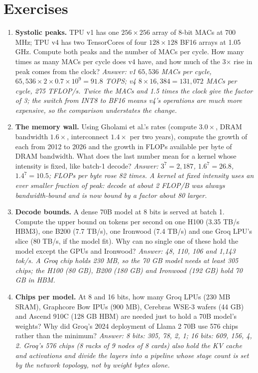\documentclass[11pt,letterpaper]{article}
\begin{document}
\section{Exercises}

\begin{enumerate}[leftmargin=1.6em,itemsep=6pt]
\item \textbf{Systolic peaks.} TPU v1 has one $256\times256$ array of 8-bit MACs at 700 MHz; TPU v4 has two TensorCores of four $128\times128$ BF16 arrays at 1.05 GHz. Compute both peaks and the number of MACs per cycle. How many times as many MACs per cycle does v4 have, and how much of the 3$\times$ rise in peak comes from the clock? \emph{Answer: v1 $65{,}536$ MACs per cycle, $65{,}536\times2\times0.7\times10^9 = 91.8$ TOPS; v4 $8\times16{,}384 = 131{,}072$ MACs per cycle, 275 TFLOP/s. Twice the MACs and 1.5 times the clock give the factor of 3; the switch from INT8 to BF16 means v4's operations are much more expensive, so the comparison understates the change.}
\item \textbf{The memory wall.} Using Gholami et al.'s rates (compute $3.0\times$, DRAM bandwidth $1.6\times$, interconnect $1.4\times$ per two years), compute the growth of each from 2012 to 2026 and the growth in FLOPs available per byte of DRAM bandwidth. What does the last number mean for a kernel whose intensity is fixed, like batch-1 decode? \emph{Answer: $3^7 = 2{,}187$, $1.6^7 = 26.8$, $1.4^7 = 10.5$; FLOPs per byte rose 82 times. A kernel at fixed intensity uses an ever smaller fraction of peak: decode at about 2 FLOP/B was always bandwidth-bound and is now bound by a factor about 80 larger.}
\item \textbf{Decode bounds.} A dense 70B model at 8 bits is served at batch 1. Compute the upper bound on tokens per second on one H100 (3.35 TB/s HBM3), one B200 (7.7 TB/s), one Ironwood (7.4 TB/s) and one Groq LPU's slice (80 TB/s, if the model fit). Why can no single one of these hold the model except the GPUs and Ironwood? \emph{Answer: 48, 110, 106 and 1{,}143 tok/s. A Groq chip holds 230 MB, so the 70 GB model needs at least 305 chips; the H100 (80 GB), B200 (180 GB) and Ironwood (192 GB) hold 70 GB in HBM.}
\item \textbf{Chips per model.} At 8 and 16 bits, how many Groq LPUs (230 MB SRAM), Graphcore Bow IPUs (900 MB), Cerebras WSE-3 wafers (44 GB) and Ascend 910C (128 GB HBM) are needed just to hold a 70B model's weights? Why did Groq's 2024 deployment of Llama 2 70B use 576 chips rather than the minimum? \emph{Answer: 8 bits: 305, 78, 2, 1; 16 bits: 609, 156, 4, 2. Groq's 576 chips (8 racks of 9 nodes of 8 cards) also hold the KV cache and activations and divide the layers into a pipeline whose stage count is set by the network topology, not by weight bytes alone.}

\end{enumerate}
\end{document}

